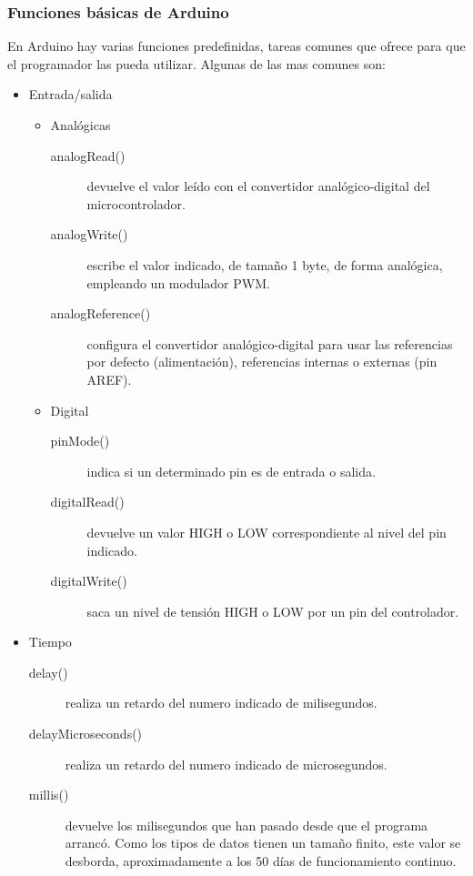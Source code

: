 \subsubsection{Funciones básicas de Arduino}
En Arduino hay varias funciones predefinidas, tareas comunes que ofrece para que el programador las pueda utilizar. Algunas de las mas comunes son:
\begin{itemize}
    \item Entrada/salida
        \begin{itemize}
            \item Analógicas
                \begin{description}
                    \item[analogRead()] devuelve el valor leído con el convertidor analógico-digital del microcontrolador.
                    \item[analogWrite()] escribe el valor indicado, de tamaño 1 byte, de forma analógica, empleando un modulador PWM.
                    \item[analogReference()] configura el convertidor analógico-digital para usar las referencias por defecto (alimentación), referencias internas o externas (pin AREF).
                \end{description}
            \item Digital
                \begin{description}
                    \item[pinMode()] indica si un determinado pin es de entrada o salida.
                    \item[digitalRead()] devuelve un valor HIGH o LOW correspondiente al nivel del pin indicado.
                    \item[digitalWrite()] saca un nivel de tensión HIGH o LOW por un pin del controlador.
                \end{description}
        \end{itemize}
    \item Tiempo
        \begin{description}
            \item[delay()] realiza un retardo del numero indicado de milisegundos.
            \item[delayMicroseconds()] realiza un retardo del numero indicado de microsegundos.
            \item[millis()] devuelve los milisegundos que han pasado desde que el programa arrancó. Como los tipos de datos tienen un tamaño finito, este valor se desborda, aproximadamente a los 50 días de funcionamiento continuo.

\end{description}
\end{itemize}

